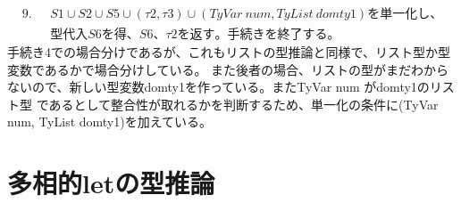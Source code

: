 \documentclass{jreport}
\begin{document}
\begin{equation}
  \begin{split}
    9. \ \ \ &S1 \cup S2 \cup S5 \cup (\tau2, \tau3) \cup (TyVar \ num, TyList \ domty1) を単一化し、\\ &
    型代入S6を得、S6、\tau2 を返す。手続きを終了する。
  \end{split}
\end{equation}
手続き4での場合分けであるが、これもリストの型推論と同様で、リスト型か型変数であるかで場合分けしている。
また後者の場合、リストの型がまだわからないので、新しい型変数domty1を作っている。またTyVar num がdomty1のリスト型
であるとして整合性が取れるかを判断するため、単一化の条件に(TyVar num, TyList domty1)を加えている。
\chapter{多相的letの型推論}
\end{document}
